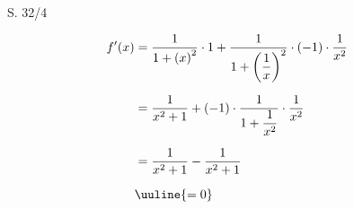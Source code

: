 \begin{Exercise}{S. 32/4}{}
\begin{enumerate}
\begin{enumerate}[label=\alph*)]
{                \begin{align*}
                    f'(x) &= \dfrac{1}{1 + \left(x\right)^{2}} \cdot 1 + \dfrac{1}{1 + \left(\dfrac{1}{x}\right)^{2}} \cdot \left(-1\right) \cdot \dfrac{1}{x^{2}} &&\\[1.5ex]
                    &= \dfrac{1}{x^{2} + 1} + \left(-1\right) \cdot  \dfrac{1}{1 + \dfrac{1}{x^{2}}} \cdot \dfrac{1}{x^{2}} && \\[1.5ex]
                    &= \dfrac{1}{x^{2} + 1} - \dfrac{1}{x^{2} + 1} && \\[1.5ex]
                    &\uuline{= 0} &&
                \end{align*}
                }
        \end{enumerate}
    \end{enumerate}
\end{Exercise}